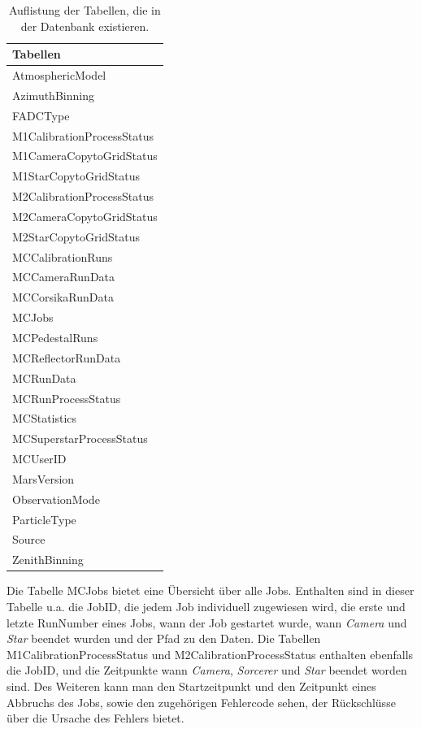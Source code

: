 \begin{table}[!h]
\centering
\caption{Auflistung der Tabellen, die in der Datenbank existieren.}
\label{MYSQL_Tabellen}
\begin{tabular}{l}
  \toprule
  Tabellen\\
  \midrule
  AtmosphericModel           \\
  AzimuthBinning             \\
  FADCType                   \\
  M1CalibrationProcessStatus \\
  M1CameraCopytoGridStatus   \\
  M1StarCopytoGridStatus     \\
  M2CalibrationProcessStatus \\
  M2CameraCopytoGridStatus   \\
  M2StarCopytoGridStatus     \\
  MCCalibrationRuns          \\
  MCCameraRunData            \\
  MCCorsikaRunData           \\
  MCJobs                     \\
  MCPedestalRuns             \\
  MCReflectorRunData         \\
  MCRunData                  \\
  MCRunProcessStatus         \\
  MCStatistics               \\
  MCSuperstarProcessStatus   \\
  MCUserID                   \\
  MarsVersion                \\
  ObservationMode            \\
  ParticleType               \\
  Source                     \\
  ZenithBinning   	     \\
  \bottomrule
\end{tabular}
\end{table}


Die Tabelle MCJobs bietet eine Übersicht über alle Jobs. 
Enthalten sind in dieser Tabelle u.a. die JobID, die jedem Job individuell zugewiesen wird, die erste und letzte RunNumber eines Jobs, wann der Job gestartet wurde, wann \textit{Camera} und \textit{Star} beendet wurden und der Pfad zu den Daten.\newline
Die Tabellen M1CalibrationProcessStatus und M2CalibrationProcessStatus enthalten ebenfalls die JobID, und die Zeitpunkte wann \textit{Camera}, \textit{Sorcerer} und \textit{Star} beendet worden sind. 
Des Weiteren kann man den Startzeitpunkt und den Zeitpunkt eines Abbruchs des Jobs, sowie den zugehörigen Fehlercode sehen, der Rückschlüsse über die Ursache des Fehlers bietet.

